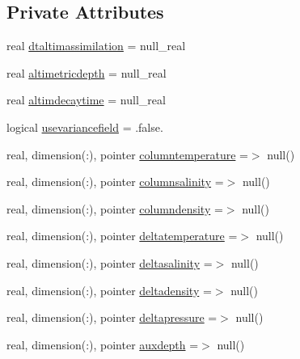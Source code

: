 \subsection*{Private Attributes}
\begin{DoxyCompactItemize}
\item 
real \mbox{\hyperlink{structmoduleassimilation_1_1t__altimetric__assim_a3c72c9b2d2034fc264af169579f80bd6}{dtaltimassimilation}} = null\+\_\+real
\item 
real \mbox{\hyperlink{structmoduleassimilation_1_1t__altimetric__assim_af87ed940a4406a343eed264225b91eee}{altimetricdepth}} = null\+\_\+real
\item 
real \mbox{\hyperlink{structmoduleassimilation_1_1t__altimetric__assim_aa97b029c5de5aad72de9955efc0af9c9}{altimdecaytime}} = null\+\_\+real
\item 
logical \mbox{\hyperlink{structmoduleassimilation_1_1t__altimetric__assim_a393c5a5212975d59ce40372dba4b578f}{usevariancefield}} = .false.
\item 
real, dimension(\+:), pointer \mbox{\hyperlink{structmoduleassimilation_1_1t__altimetric__assim_a61e9c5691bcf6aaef654853d305b73e0}{columntemperature}} =$>$ null()
\item 
real, dimension(\+:), pointer \mbox{\hyperlink{structmoduleassimilation_1_1t__altimetric__assim_ab19ef851d842c97d96395063a750498c}{columnsalinity}} =$>$ null()
\item 
real, dimension(\+:), pointer \mbox{\hyperlink{structmoduleassimilation_1_1t__altimetric__assim_af342188397daab8f7bfc4c7e91d8caf5}{columndensity}} =$>$ null()
\item 
real, dimension(\+:), pointer \mbox{\hyperlink{structmoduleassimilation_1_1t__altimetric__assim_a195e8321502ed47d17c564f3aae52060}{deltatemperature}} =$>$ null()
\item 
real, dimension(\+:), pointer \mbox{\hyperlink{structmoduleassimilation_1_1t__altimetric__assim_aa513181d126981471990ec33a6d3c482}{deltasalinity}} =$>$ null()
\item 
real, dimension(\+:), pointer \mbox{\hyperlink{structmoduleassimilation_1_1t__altimetric__assim_a3b33aa2f8a0d48962f8caaff20c4e76f}{deltadensity}} =$>$ null()
\item 
real, dimension(\+:), pointer \mbox{\hyperlink{structmoduleassimilation_1_1t__altimetric__assim_ac365197d8d2d40a88d732095288a5cbc}{deltapressure}} =$>$ null()
\item 
real, dimension(\+:), pointer \mbox{\hyperlink{structmoduleassimilation_1_1t__altimetric__assim_afd41d1c385e04034e686560ef36d38b4}{auxdepth}} =$>$ null()

\end{DoxyCompactItemize}
